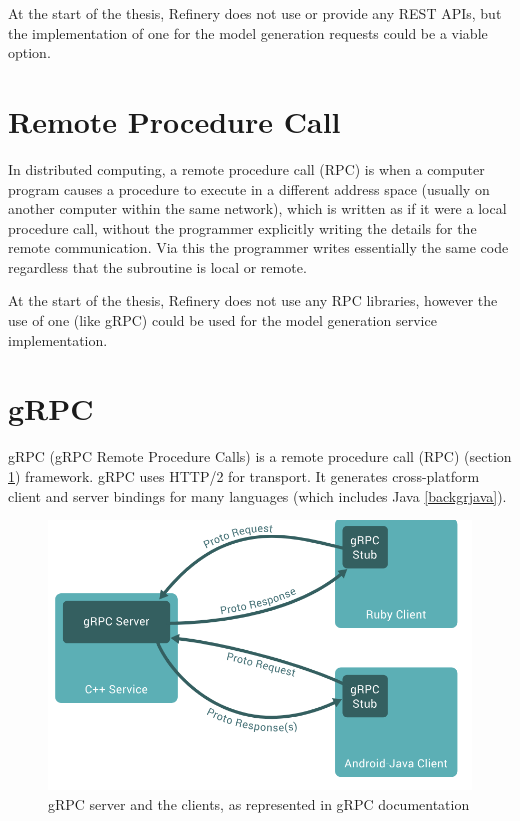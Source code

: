 	At the start of the thesis, Refinery does not use or provide any REST APIs, but the implementation of one for the model 
	generation requests could be a viable option.

\section{Remote Procedure Call} \label{backgrpc}
	In distributed computing, a remote procedure call (RPC) \cite{rpc} is when a computer program causes a procedure  
	to execute in a different address space 
	(usually on another computer within the same network), 
	which is written as if it were a local procedure call, without the programmer 
	explicitly writing the details for the remote communication. 
	Via this the programmer writes essentially the same code regardless that the subroutine is local or remote.

	At the start of the thesis, Refinery does not use any RPC libraries, however the use of one (like gRPC) could be used for the model generation service implementation.

\section{gRPC} \label{backgrgrpc}
	gRPC (gRPC Remote Procedure Calls) \cite{grpcwiki} is a remote procedure call (RPC) (section \ref{backgrpc}) framework. 
	gRPC uses HTTP/2 for transport.	It generates cross-platform client and server bindings for many languages (which includes 
	Java \ref{backgrjava}). 

	\begin{figure}[h!]
		\begin{center}
			\includegraphics[scale=0.8]{include/imgs/grpc_works.PNG}	
		\end{center}
		\caption{gRPC server and the clients, as represented in gRPC documentation \cite{grpcspec}}
	\end{figure}

